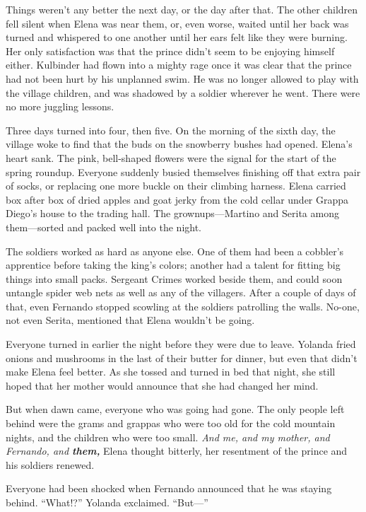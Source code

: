 \documentclass[10pt]{book}
\begin{document}
Things weren't any better the next day, or the day after that. The other children fell silent when Elena was near them, or, even worse, waited until her back was turned and whispered to one another until her ears felt like they were burning. Her only satisfaction was that the prince didn't seem to be enjoying himself either. Kulbinder had flown into a mighty rage once it was clear that the prince had not been hurt by his unplanned swim.  He was no longer allowed to play with the village children, and was shadowed by a soldier wherever he went. There were no more juggling lessons.

Three days turned into four, then five. On the morning of the sixth day, the village woke to find that the buds on the snowberry bushes had opened. Elena's heart sank. The pink, bell-shaped flowers were the signal for the start of the spring roundup. Everyone suddenly busied themselves finishing off that extra pair of socks, or replacing one more buckle on their climbing harness. Elena carried box after box of dried apples and goat jerky from the cold cellar under Grappa Diego's house to the trading hall. The grownups---Martino and Serita among them---sorted and packed well into the night.

The soldiers worked as hard as anyone else. One of them had been a cobbler's apprentice before taking the king's colors; another had a talent for fitting big things into small packs. Sergeant Crimes worked beside them, and could soon untangle spider web nets as well as any of the villagers. After a couple of days of that, even Fernando stopped scowling at the soldiers patrolling the walls. No-one, not even Serita, mentioned that Elena wouldn't be going.

Everyone turned in earlier the night before they were due to leave. Yolanda fried onions and mushrooms in the last of their butter for dinner, but even that didn't make Elena feel better. As she tossed and turned in bed that night, she still hoped that her mother would announce that she had changed her mind.

But when dawn came, everyone who was going had gone. The only people left behind were the grams and grappas who were too old for the cold mountain nights, and the children who were too small. \emph{And me, and my mother, and Fernando, and \bf{them},} Elena thought bitterly, her resentment of the prince and his soldiers renewed.

Everyone had been shocked when Fernando announced that he was staying behind. ``What!?'' Yolanda exclaimed. ``But---''
\end{document}
